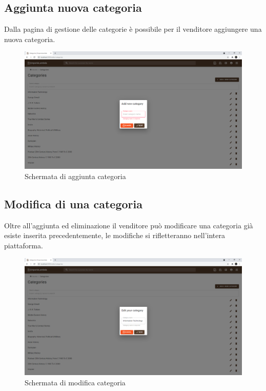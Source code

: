 \subsection{Aggiunta nuova categoria}
Dalla pagina di gestione delle categorie è possibile per il venditore aggiungere una nuova categoria.
\begin{figure}[H]
	\centering
	\includegraphics[scale=0.35]{Immagini/Venditore/Add Category.png}
	\caption{Schermata di aggiunta categoria}
	\label{fig:AggiuntaCategoria}
\end{figure}
\subsection{Modifica di una categoria}
Oltre all'aggiunta ed eliminazione il venditore può modificare una categoria già esiste inserita precedentemente, le modifiche si rifletteranno nell'intera piattaforma.
\begin{figure}[H]
	\centering
	\includegraphics[scale=0.35]{Immagini/Venditore/edit Category.png}
	\caption{Schermata di modifica categoria}
	\label{fig:ModificaCategoria}
\end{figure}